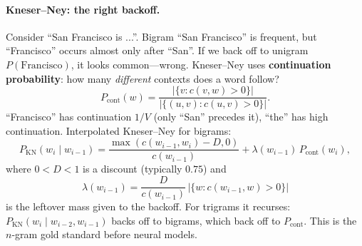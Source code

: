 \paragraph{Kneser--Ney: the right backoff.} Consider ``San Francisco is ...''. Bigram ``San Francisco'' is frequent, but ``Francisco'' occurs almost only after ``San''. If we back off to unigram $P(\text{Francisco})$, it looks common---wrong. Kneser--Ney uses \textbf{continuation probability}: how many \emph{different} contexts does a word follow?
\begin{equation}
P_{\text{cont}}(w)=\frac{|\{v: c(v,w)>0\}|}{|\{(u,v):c(u,v)>0\}|}.
\label{eq:cont}
\end{equation}
``Francisco'' has continuation $1/V$ (only ``San'' precedes it), ``the'' has high continuation. Interpolated Kneser--Ney for bigrams:
\begin{equation}
P_{\text{KN}}(w_{i}\mid w_{i-1})=\frac{\max(c(w_{i-1},w_{i})-D,0)}{c(w_{i-1})}+\lambda(w_{i-1})\,P_{\text{cont}}(w_{i}),
\label{eq:kn}
\end{equation}
where $0<D<1$ is a discount (typically $0.75$) and
\begin{equation}
\lambda(w_{i-1})=\frac{D}{c(w_{i-1})}\,|\{w:c(w_{i-1},w)>0\}|
\label{eq:lambda}
\end{equation}
is the leftover mass given to the backoff. For trigrams it recurses: $P_{\text{KN}}(w_{i}\mid w_{i-2},w_{i-1})$ backs off to bigrams, which back off to $P_{\text{cont}}$. This is the $n$-gram gold standard before neural models.
